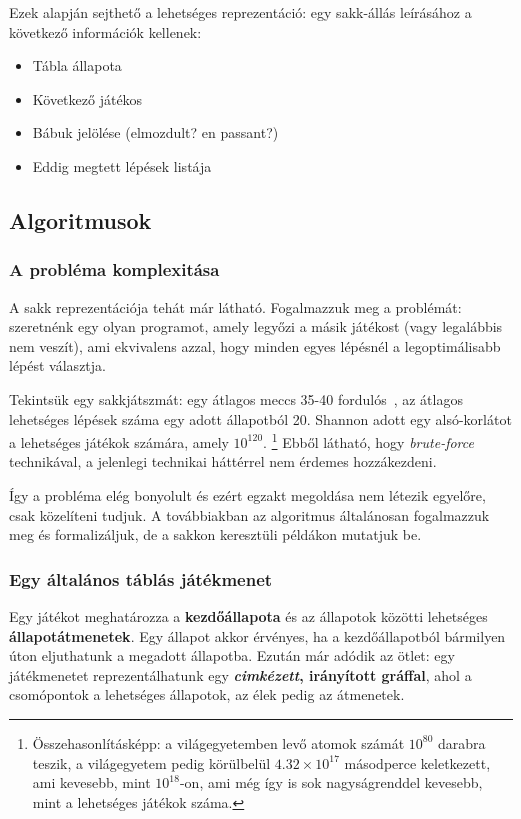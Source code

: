 \documentclass[twoside, a4paper, 12pt]{article}
\begin{document}
Ezek alapján sejthető a lehetséges reprezentáció: egy sakk-állás leírásához a következő információk kellenek:
\begin{itemize}
	\item Tábla állapota
	\item Következő játékos
	\item Bábuk jelölése (elmozdult? en passant?)
	\item Eddig megtett lépések listája
\end{itemize}


\subsection{Algoritmusok}
\subsubsection{A probléma komplexitása}
A sakk reprezentációja tehát már látható. Fogalmazzuk meg a problémát: szeretnénk egy olyan programot, amely legyőzi a másik játékost (vagy legalábbis nem veszít), ami ekvivalens azzal, hogy minden egyes lépésnél a legoptimálisabb lépést választja.

Tekintsük egy sakkjátszmát: egy átlagos meccs 35-40 fordulós~\cite{averageLengthOfChessGame}\cite{averageLengthOfChessGame2}\cite{chessStatistics}, az átlagos lehetséges lépések száma egy adott állapotból 20\cite{shannonnumber}. Shannon adott egy alsó-korlátot a lehetséges játékok számára, amely $10^{120}$. \footnote{Összehasonlításképp: a világegyetemben levő atomok számát $10^{80}$ darabra teszik, a világegyetem pedig körülbelül $4.32 \times 10^{17}$ másodperce keletkezett, ami kevesebb, mint $10^{18}$-on, ami még így is sok nagyságrenddel kevesebb, mint a lehetséges játékok száma.} Ebből látható, hogy \textit{brute-force} technikával, a jelenlegi technikai háttérrel nem érdemes hozzákezdeni.

Így a probléma elég bonyolult és ezért egzakt megoldása nem létezik egyelőre, csak közelíteni tudjuk. A továbbiakban az algoritmus általánosan fogalmazzuk meg és formalizáljuk, de a sakkon keresztüli példákon mutatjuk be.

\subsubsection{Egy általános táblás játékmenet}
Egy játékot meghatározza a \textbf{kezdőállapota} és az állapotok közötti lehetséges \textbf{állapotátmenetek}. Egy állapot akkor érvényes, ha a kezdőállapotból bármilyen úton eljuthatunk a megadott állapotba. Ezután már adódik az ötlet: egy játékmenetet reprezentálhatunk egy \textbf{\textit{cimkézett}, irányított gráffal}, ahol a csomópontok a lehetséges állapotok, az élek pedig az átmenetek.
\end{document}
